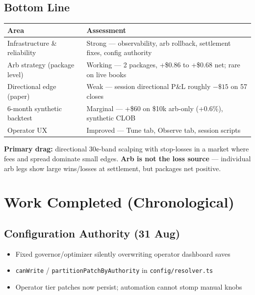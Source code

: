\documentclass[11pt,a4paper]{article}
\begin{document}
\subsection{Bottom Line}
\begin{table}[h]
\centering
\small
\begin{tabular}{@{}ll@{}}
\toprule
\textbf{Area} & \textbf{Assessment} \\
\midrule
Infrastructure \& reliability & \textcolor{zingerok}{Strong} --- observability, arb rollback, settlement fixes, config authority \\
Arb strategy (package level) & \textcolor{zingerok}{Working} --- 2 packages, +\$0.86 to +\$0.68 net; rare on live books \\
Directional edge (paper) & \textcolor{zingerwarn}{Weak} --- session directional P\&L roughly $-\$15$ on 57 closes \\
6-month synthetic backtest & \textcolor{zingerwarn}{Marginal} --- +\$60 on \$10k arb-only (+0.6\%), synthetic CLOB \\
Operator UX & \textcolor{zingerok}{Improved} --- Tune tab, Observe tab, session scripts \\
\bottomrule
\end{tabular}
\end{table}

\noindent
\textbf{Primary drag:} directional 30¢-band scalping with stop-losses in a market where fees and spread dominate small edges. \textbf{Arb is not the loss source} --- individual arb legs show large wins/losses at settlement, but packages net positive.

\section{Work Completed (Chronological)}

\subsection{Configuration Authority (31 Aug)}
\begin{itemize}[noitemsep]
  \item Fixed governor/optimizer silently overwriting operator dashboard saves
  \item \texttt{canWrite} / \texttt{partitionPatchByAuthority} in \texttt{config/resolver.ts}
  \item Operator tier patches now persist; automation cannot stomp manual knobs
\end{itemize}
\end{document}
